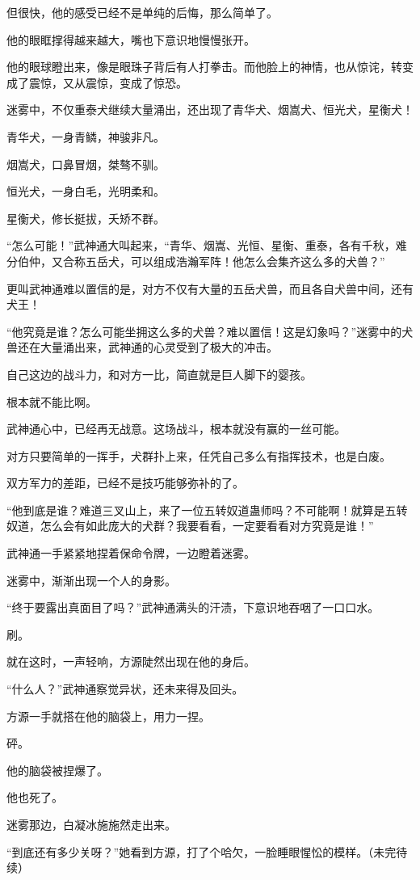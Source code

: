 \begin{this_body}
但很快，他的感受已经不是单纯的后悔，那么简单了。

他的眼眶撑得越来越大，嘴也下意识地慢慢张开。

他的眼球瞪出来，像是眼珠子背后有人打拳击。而他脸上的神情，也从惊诧，转变成了震惊，又从震惊，变成了惊恐。

迷雾中，不仅重泰犬继续大量涌出，还出现了青华犬、烟嵩犬、恒光犬，星衡犬！

青华犬，一身青鳞，神骏非凡。

烟嵩犬，口鼻冒烟，桀骜不驯。

恒光犬，一身白毛，光明柔和。

星衡犬，修长挺拔，夭矫不群。

“怎么可能！”武神通大叫起来，“青华、烟嵩、光恒、星衡、重泰，各有千秋，难分伯仲，又合称五岳犬，可以组成浩瀚军阵！他怎么会集齐这么多的犬兽？”

更叫武神通难以置信的是，对方不仅有大量的五岳犬兽，而且各自犬兽中间，还有犬王！

“他究竟是谁？怎么可能坐拥这么多的犬兽？难以置信！这是幻象吗？”迷雾中的犬兽还在大量涌出来，武神通的心灵受到了极大的冲击。

自己这边的战斗力，和对方一比，简直就是巨人脚下的婴孩。

根本就不能比啊。

武神通心中，已经再无战意。这场战斗，根本就没有赢的一丝可能。

对方只要简单的一挥手，犬群扑上来，任凭自己多么有指挥技术，也是白废。

双方军力的差距，已经不是技巧能够弥补的了。

“他到底是谁？难道三叉山上，来了一位五转奴道蛊师吗？不可能啊！就算是五转奴道，怎么会有如此庞大的犬群？我要看看，一定要看看对方究竟是谁！”

武神通一手紧紧地捏着保命令牌，一边瞪着迷雾。

迷雾中，渐渐出现一个人的身影。

“终于要露出真面目了吗？”武神通满头的汗渍，下意识地吞咽了一口口水。

刷。

就在这时，一声轻响，方源陡然出现在他的身后。

“什么人？”武神通察觉异状，还未来得及回头。

方源一手就搭在他的脑袋上，用力一捏。

砰。

他的脑袋被捏爆了。

他也死了。

迷雾那边，白凝冰施施然走出来。

“到底还有多少关呀？”她看到方源，打了个哈欠，一脸睡眼惺忪的模样。（未完待续）

\end{this_body}

